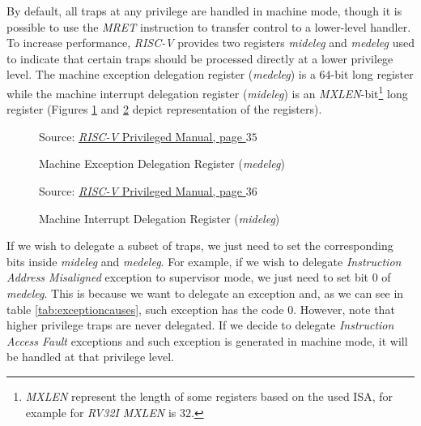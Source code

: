 By default, all traps at any privilege are handled in machine mode, though it is
possible to use the \textit{MRET} instruction to transfer control to a lower-level
handler. To increase performance, \textit{RISC-V} provides two registers \textit{mideleg}
and \textit{medeleg} used to indicate that certain traps should be processed directly
at a lower privilege level. The machine exception delegation register (\textit{medeleg})
is a $64$-bit long register while the machine interrupt delegation register (\textit{mideleg})
is an \textit{MXLEN}-bit\footnote{\textit{MXLEN} represent the length of some registers
based on the used ISA, for example for \textit{RV32I} \textit{MXLEN} is $32$.}
long register (Figures \ref{fig:medeleg} and \ref{fig:mideleg} depict representation
of the registers). \\
\begin{figure}[H]
  \centering
  \def\stackalignment{r} %
  {\scriptsize Source: \href{https://drive.google.com/file/d/17GeetSnT5wW3xNuAHI95-SI1gPGd5sJ_/view}{\textit{RISC-V} Privileged Manual, page $35$}}
  \caption{Machine Exception Delegation Register (\textit{medeleg})}
  \label{fig:medeleg}
\end{figure}

\begin{figure}[H]
  \centering
  \def\stackalignment{r} %
  {\scriptsize Source: \href{https://drive.google.com/file/d/17GeetSnT5wW3xNuAHI95-SI1gPGd5sJ_/view}{\textit{RISC-V} Privileged Manual, page $36$}}
  \caption{Machine Interrupt Delegation Register (\textit{mideleg})}
  \label{fig:mideleg}
\end{figure}

If we wish to delegate a subset of traps, we just need to set the corresponding
bits inside \textit{mideleg} and \textit{medeleg}. For example, if we wish to
delegate \textit{Instruction Address Misaligned} exception to supervisor mode,
we just need to set bit $0$ of \textit{medeleg}. This is because we want to
delegate an exception and, as we can see in table \ref{tab:exceptioncauses},
such exception has the code $0$. However, note that higher privilege traps are
never delegated. If we decide to delegate \textit{Instruction Access Fault}
exceptions and such exception is generated in machine mode, it will be handled at
that privilege level.

